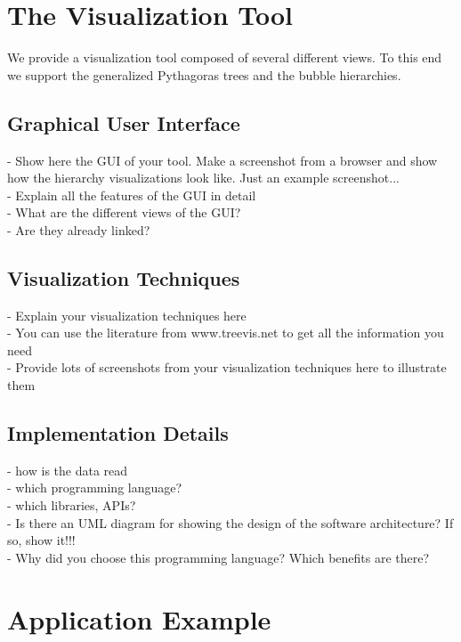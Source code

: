 \documentclass[journal]{vgtc}                %
\begin{document}
\section{The Visualization Tool}

We provide a visualization tool composed of several different views. To this end we support the generalized Pythagoras trees and the bubble hierarchies.



\subsection{Graphical User Interface}

- Show here the GUI of your tool. Make a screenshot from a browser and show how the hierarchy visualizations look like. Just an example screenshot...\\
- Explain all the features of the GUI in detail\\
- What are the different views of the GUI?\\
- Are they already linked?




\subsection{Visualization Techniques}

- Explain your visualization techniques here\\
- You can use the literature from www.treevis.net to get all the information you need\\
- Provide lots of screenshots from your visualization techniques here to illustrate them



\subsection{Implementation Details}

- how is the data read\\
- which programming language?\\
- which libraries, APIs?\\
- Is there an UML diagram for showing the design of the software architecture? If so, show it!!!\\
- Why did you choose this programming language? Which benefits are there?


\section{Application Example}
\end{document}
